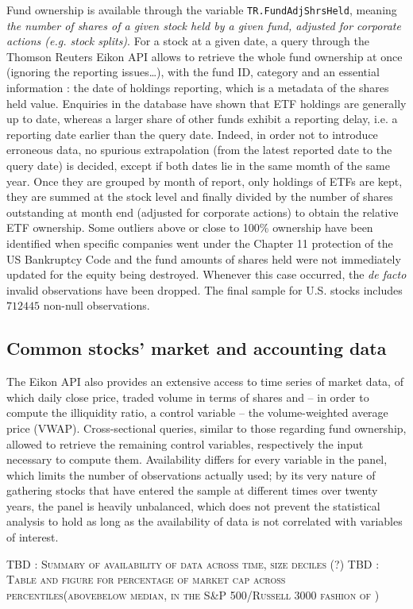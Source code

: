 Fund ownership is available through the variable \texttt{TR.FundAdjShrsHeld}, meaning \textit{the number of shares of a given stock held by a given fund, adjusted for corporate actions (e.g. stock splits)}. For a stock at a given date, a query through the Thomson Reuters Eikon API allows to retrieve the whole fund ownership at once (ignoring the reporting issues\dots), with the fund ID, category and an essential information : the date of holdings reporting, which is a metadata of the shares held value. Enquiries in the database have shown that ETF holdings are generally up to date, whereas a larger share of other funds exhibit a reporting delay, i.e. a reporting date earlier than the query date. Indeed, in order not to introduce erroneous data, no spurious extrapolation (from the latest reported date to the query date) is decided, except if both dates lie in the same momth of the same year. Once they are grouped by month of report, only holdings of ETFs are kept, they are summed at the stock level and finally divided by the number of shares outstanding at month end (adjusted for corporate actions) to obtain the relative ETF ownership. Some outliers above or close to 100\% ownership have been identified when specific companies went under the Chapter 11 protection of the US Bankruptcy Code and the fund amounts of shares held were not immediately updated for the equity being destroyed. Whenever this case occurred, the \textit{de facto} invalid observations have been dropped. The final sample for U.S. stocks includes $712445$ non-null observations.
\subsection{Common stocks' market and accounting data}
The Eikon API also provides an extensive access to time series of market data, of which daily close price, traded volume in terms of shares and -- in order to compute the \cite{Amihud2002} illiquidity ratio, a control variable -- the volume-weighted average price (VWAP). Cross-sectional queries, similar to those regarding fund ownership, allowed to retrieve the remaining control variables, respectively the input necessary to compute them. Availability differs for every variable in the panel, which limits the number of observations actually used; by its very nature of gathering stocks that have entered the sample at different times over twenty years, the panel is heavily unbalanced, which does not prevent the statistical analysis to hold as long as the availability of data is not correlated with variables of interest.

\begin{center}
  \textsc{TBD : Summary of availability of data across time, size deciles (?)}
  \textsc{TBD : Table and figure for percentage of market cap across percentiles(above\/below median, in the S\&P 500/Russell 3000 fashion of \cite{Ben-David2018})}
\end{center}
